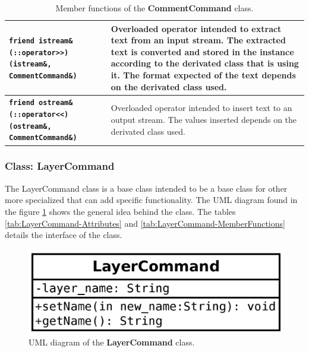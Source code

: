 \documentclass[11pt,twoside,openany,x11names,svgnames]{memoir}
\begin{document}
\begin{table}[h]
\begin{tabular}{| >{\bfseries}p{8.5cm} | p{7cm} |}
	\hline
	
	\texttt{friend istream\& (::operator>>) (istream\&, CommentCommand\&)} & Overloaded operator intended to extract text from an input stream. The extracted text is converted and stored in the instance according to the derivated class that is using it. The format expected of the text depends on the derivated class used. \\
	
	\hline
	
	\texttt{friend ostream\& (::operator<<) (ostream\&, CommentCommand\&)} & Overloaded operator intended to insert text to an output stream. The values inserted depends on the derivated class used. \\	
	
	\hline
\end{tabular}
\caption{Member functions of the \textbf{CommentCommand} class.}
\label{tab:CommentCommand-MemberFunctions}
\end{table}

\clearpage

\subsubsection{Class: LayerCommand}\label{Class-LayerCommand}

The LayerCommand class is a base class intended to be a base class for other more specialized that can add specific functionality. The UML diagram found in the figure \ref{fig:class-layer-command} shows the general idea behind the class. The tables \ref{tab:LayerCommand-Attributes} and \ref{tab:LayerCommand-MemberFunctions} details the interface of the class.

\begin{figure}
	\centering
	\includegraphics[scale=0.2, clip=true, trim= 0pt 0pt 0pt 0pt]{images/chapter03-image33}
	\caption{UML diagram of the \textbf{LayerCommand} class.}
	\label{fig:class-layer-command}
\end{figure}
\end{document}
